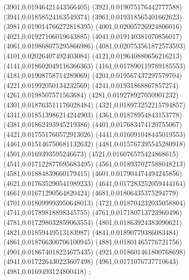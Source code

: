{(3901,0.01946421443566405)
(3921,0.019075176442777588)
(3941,0.01858524163549374)
(3961,0.019318565401662623)
(3981,0.019014766272818395)
(4001,0.02005726924806016)
(4021,0.01927106019643885)
(4041,0.019140381070856017)
(4061,0.019868075295866986)
(4081,0.020753561872573593)
(4101,0.02026407492403084)
(4121,0.019640880656216213)
(4141,0.018602049116366363)
(4161,0.017890119789185553)
(4181,0.01908758714289069)
(4201,0.019567437297579704)
(4221,0.01992050134232569)
(4241,0.01931868867857274)
(4261,0.0198507571563684)
(4281,0.019278927050901232)
(4301,0.018763511176028484)
(4321,0.018973252215794857)
(4341,0.018513986214244903)
(4361,0.01878954843153778)
(4381,0.01862493945219386)
(4401,0.017683474120755067)
(4421,0.017551760572913026)
(4441,0.016091048445019553)
(4461,0.015146750681132632)
(4481,0.015767395545280918)
(4501,0.0169393595246673)
(4521,0.016076575424868615)
(4541,0.017122877695683495)
(4561,0.018937027588048213)
(4581,0.01884839660179415)
(4601,0.017904474494245856)
(4621,0.017635290541989233)
(4641,0.017283252059444164)
(4661,0.01671290564820424)
(4681,0.01806435375294779)
(4701,0.018099993950648013)
(4721,0.018704232035058804)
(4741,0.01789818898345755)
(4761,0.017180713723960496)
(4781,0.017298032859063554)
(4801,0.01863924383090621)
(4821,0.01859449513183987)
(4841,0.01890779386083484)
(4861,0.018766300706100945)
(4881,0.01801465776721756)
(4901,0.018674018224675435)
(4921,0.018601461800768698)
(4941,0.017226430223607498)
(4961,0.0171076737710643)
(4981,0.0169493124800418)
};
